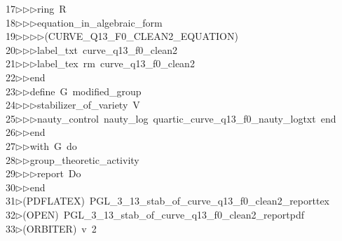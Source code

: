 \begin{tabbing}
17\>$\triangleright$\>$\triangleright$\>$\triangleright$\>ring\ R\ \\[0pt]
18\>$\triangleright$\>$\triangleright$\>$\triangleright$\>equation\_in\_algebraic\_form\ \\[0pt]
19\>$\triangleright$\>$\triangleright$\>$\triangleright$\>$\triangleright$\>(CURVE\_Q13\_F0\_CLEAN2\_EQUATION)\ \\[0pt]
20\>$\triangleright$\>$\triangleright$\>$\triangleright$\>label\_txt\ curve\_q13\_f0\_clean2\ \\[0pt]
21\>$\triangleright$\>$\triangleright$\>$\triangleright$\>label\_tex\ rm\ curve\_q13\_f0\_clean2\ \\[0pt]
22\>$\triangleright$\>$\triangleright$\>end\ \\[0pt]
23\>$\triangleright$\>$\triangleright$\>define\ G\ modified\_group\ \\[0pt]
24\>$\triangleright$\>$\triangleright$\>$\triangleright$\>stabilizer\_of\_variety\ V\ \\[0pt]
25\>$\triangleright$\>$\triangleright$\>$\triangleright$\>nauty\_control\ nauty\_log\ quartic\_curve\_q13\_f0\_nauty\_logtxt\ end\ \\[0pt]
26\>$\triangleright$\>$\triangleright$\>end\ \\[0pt]
27\>$\triangleright$\>$\triangleright$\>with\ G\ do\ \\[0pt]
28\>$\triangleright$\>$\triangleright$\>group\_theoretic\_activity\ \\[0pt]
29\>$\triangleright$\>$\triangleright$\>$\triangleright$\>report\ Do\ \\[0pt]
30\>$\triangleright$\>$\triangleright$\>end\\[0pt]
31\>$\triangleright$\>(PDFLATEX)\ PGL\_3\_13\_stab\_of\_curve\_q13\_f0\_clean2\_reporttex\\[0pt]
32\>$\triangleright$\>(OPEN)\ PGL\_3\_13\_stab\_of\_curve\_q13\_f0\_clean2\_reportpdf\\[0pt]
33\>$\triangleright$\>(ORBITER)\ v\ 2\ \\[0pt]

\end{tabbing}
